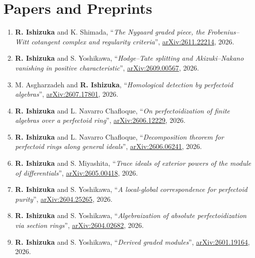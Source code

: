 \documentclass[10pt,a4paper,sans]{moderncv}
\begin{document}
\section{Papers and Preprints}
\begin{enumerate}
  \item[17.] \textbf{R. Ishizuka} and K. Shimada, ``\emph{The Nygaard graded piece, the Frobenius--Witt cotangent complex and regularity criteria}'', \href{https://arxiv.org/abs/2611.22214}{arXiv:2611.22214}, 2026.

  \item[16.] \textbf{R. Ishizuka} and S. Yoshikawa, ``\emph{Hodge--Tate splitting and Akizuki--Nakano vanishing in positive characteristic}'', \href{https://arxiv.org/abs/2609.00567}{arXiv:2609.00567}, 2026.
  
  \item[15.] M. Asgharzadeh and \textbf{R. Ishizuka}, ``\emph{Homological detection by perfectoid algebras}'', \href{https://arxiv.org/abs/2607.17801}{arXiv:2607.17801}, 2026.

  \item[14.] \textbf{R. Ishizuka} and L. Navarro Chafloque, ``\emph{On perfectoidization of finite algebras over a perfectoid ring}'', \href{https://arxiv.org/abs/2606.12229}{arXiv:2606.12229}, 2026.

  \item[13.] \textbf{R. Ishizuka} and L. Navarro Chafloque, ``\emph{Decomposition theorem for perfectoid rings along general ideals}'', \href{https://arxiv.org/abs/2606.06241}{arXiv:2606.06241}, 2026.

  \item[12.] \textbf{R. Ishizuka} and S. Miyashita, ``\emph{Trace ideals of exterior powers of the module of differentials}'', \href{https://arxiv.org/abs/2605.00418}{arXiv:2605.00418}, 2026.

  \item[11.] \textbf{R. Ishizuka} and S. Yoshikawa, ``\emph{A local-global correspondence for perfectoid purity}'', \href{https://arxiv.org/abs/2604.25265}{arXiv:2604.25265}, 2026.

  \item[10.] \textbf{R. Ishizuka} and S. Yoshikawa, ``\emph{Algebraization of absolute perfectoidization via section rings}'', \href{https://arxiv.org/abs/2604.02682}{arXiv:2604.02682}, 2026.

  \item[9.] \textbf{R. Ishizuka} and S. Yoshikawa, ``\emph{Derived graded modules}'', \href{https://arxiv.org/abs/2601.19164}{arXiv:2601.19164}, 2026.


\end{enumerate}
\end{document}
